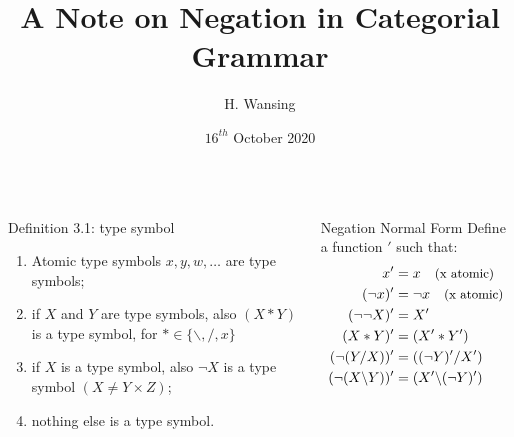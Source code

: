 \documentclass{beamer}
\title{A Note on Negation in Categorial Grammar}
\author{H. Wansing}
\date{$16^{th}$ October 2020}
\begin{document}
\begin{frame}
  \titlepage
\end{frame}

\begin{frame}

\begin{columns}

\begin{column}{0.4 \textwidth}
\begin{exampleblock}{Definition 3.1: type symbol}
  \begin{enumerate}
    \item Atomic type symbols $x,y,w,\dots$ are type symbols;
    \item if $X$ and $Y$ are type symbols, also $(X * Y)$ is a type symbol, for $ * \in \{ \backslash , / , x \}$
    \item if $X$ is a type symbol, also $\neg X$ is a type symbol $( X \neq Y \times Z)$;
    \item nothing else is a type symbol.
  \end{enumerate}
\end{exampleblock}
\end{column}

  \begin{column}{0.4 \textwidth}
  \begin{exampleblock}{Negation Normal Form}
  Define a function $'$ such that:
  \begin{align*}
    x' &= x \quad \text{\small (x atomic)}\\
    (\neg x)' &= \neg x \quad \text{\small (x atomic)}\\
    (\neg\neg X)' &= X' \\
    (X * Y)' &= (X' * Y') \\
    (\neg(Y/X))' &= ((\neg Y)'/X') \\
    (\neg (X\backslash Y))' &= (X' \backslash (\neg Y)')
  \end{align*}   
    \end{exampleblock} 
  \end{column}

\end{columns}
  
\end{frame}
\end{document}

